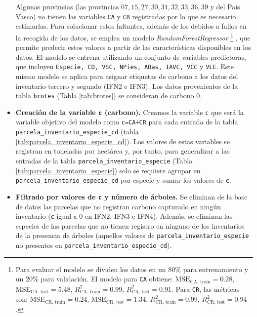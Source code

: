 \begin{itemize}
    \medskip

    Algunas provincias (las provincias $07, 15, 27, 30, 31, 32, 33, 36, 39$ y del País Vasco) no tienen las variables \texttt{CA} y \texttt{CR} registradas por lo que es necesario estimarlas. Para solucionar estos faltantes, además de los debidos a fallos en la recogida de los datos, se emplea un  modelo \textit{RandomForestRegressor}
\footnote{Para evaluar el modelo se dividen los datos en un $80\%$ para entrenamiento y un $20\%$ para validación. El modelo para \texttt{CA} obtiene: $\text{MSE}_{\text{CA, train}}= 0.28$, $\text{MSE}_{\text{CA, test}} = 5.48$, $R^2_{\text{CA, train}} = 0.99$, $R^2_{\text{CA, test}} = 0.91$. Para \texttt{CR}, las métricas son: $\text{MSE}_{\text{CR, train}}= 0.24$, $\text{MSE}_{\text{CR, test}}= 1.34$, $R^2_{\text{CR, train}} = 0.99$, $R^2_{\text{CR, test}} = 0.94$.}
, que permite predecir estos valores a partir de las características disponibles en los datos. El modelo se entrena utilizando un conjunto de variables predictoras, que incluyen \texttt{Especie,  CD, VSC, NPies, ABas, IAVC, VCC} y \texttt{VLE}. Este mismo modelo se aplica para asignar etiquetas de carbono a los datos del inventario tercero y segundo (IFN2 e IFN3). Los datos provenientes de la tabla \texttt{brotes} (Tabla \ref{tab:brotes}) se consideran de carbono $0$. 

\medskip

\item \textbf{Creación de la variable \texttt{c} (carbono).} Creamos la variable \texttt{c} que será la variable objetivo del modelo como \texttt{c=CA+CR} para cada entrada de la tabla \texttt{parcela\_inventario\_especie\_cd} (tabla \ref{tab:parcela_inventario_especie_cd}). Los valores de estas variables se registran en toneladas por hectárea y, por tanto, para generalizar a las entradas de la tabla \texttt{parcela\_inventario\_especie} (Tabla \ref{tab:parcela_inventario_especie}) solo se requiere agrupar en \texttt{parcela\_inventario\_especie\_cd} por especie y sumar los valores de \texttt{c}.

\item \textbf{Filtrado por valores de \texttt{c} y número de árboles.} Se eliminan de la base de datos las parcelas que no registran carbono capturado en ningún inventario (\texttt{c} igual a 0 en IFN2, IFN3 e IFN4). Además, se eliminan las especies de las parcelas que no tienen registro en ninguno de los inventarios de la presencia de árboles (aquellos valores de \texttt{parcela\_inventario\_especie} no presentes en \texttt{parcela\_inventario\_especie\_cd}). 


\end{itemize}
